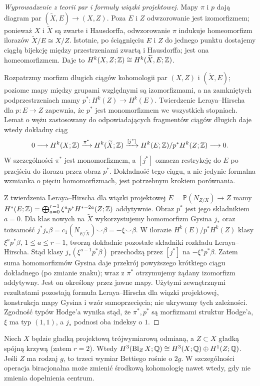 \begin{proof}[Wyprowadzenie z teorii par i formuły wiązki projektowej]
Mapy $\pi$ i $p$ dają diagram par $(\widetilde X,E)\to(X,Z)$.
Poza $E$ i $Z$ odwzorowanie jest izomorfizmem;
ponieważ $X$ i $\widetilde X$ są zwarte i Hausdorffa, odwzorowanie
$\pi$ indukuje homeomorfizm ilorazów
$\widetilde X/E\cong X/Z$. Istotnie, po ściągnięciu $E$ i $Z$
do jednego punktu dostajemy ciągłą bijekcję między przestrzeniami
zwartą i Hausdorffa; jest ona homeomorfizmem. Daje to
$H^k(X,Z;\mathbb{Z})\cong H^k(\widetilde X,E;\mathbb{Z})$.

Rozpatrzmy morfizm długich ciągów kohomologii par
$(X,Z)$ i $(\widetilde X,E)$; poziome mapy między grupami
względnymi są izomorfizmami, a na zamkniętych podprzestrzeniach
mamy $p^*:H^k(Z)\to H^k(E)$.
Twierdzenie Leraya--Hirscha dla $p:E\to Z$ zapewnia, że
$p^*$ jest monomorfizmem we wszystkich stopniach.
Lemat o wężu zastosowany do odpowiadających fragmentów
ciągów długich daje wtedy dokładny ciąg
\[
0\longrightarrow H^k(X;\mathbb{Z})\xrightarrow{\pi^*}
H^k(\widetilde X;\mathbb{Z})\xrightarrow{[j^*]}
H^k(E;\mathbb{Z})/p^*H^k(Z;\mathbb{Z})\longrightarrow0.
\]
W szczególności $\pi^*$ jest monomorfizmem, a $[j^*]$
oznacza restrykcję do $E$ po przejściu do ilorazu przez obraz
$p^*$. Dokładność tego ciągu, a nie jedynie formalna wzmianka
o pięciu homomorfizmach, jest potrzebnym krokiem porównania.

Z twierdzenia Leraya--Hirscha dla wiązki projektowej
$E=\mathbb P(N_{Z/X})\to Z$ mamy
$H^*(E;\mathbb{Z})=\bigoplus_{a=0}^{r-1}\xi^a p^*H^{*-2a}(Z;\mathbb{Z})$
addytywnie. Obraz $p^*$ jest jego składnikiem $a=0$.
Dla klas nowych na $\widetilde X$ wykorzystujemy
homomorfizm Gysina $j_*$ oraz tożsamość
$j^*j_*\beta=c_1(N_{E/\widetilde X})\smile\beta
=-\xi\smile\beta$.
W ilorazie $H^k(E)/p^*H^k(Z)$ klasy
$\xi^ap^*\beta$, $1\le a\le r-1$, tworzą dokładnie
pozostałe składniki rozkładu Leraya--Hirscha.
Stąd klasy $j_*(\xi^{a-1}p^*\beta)$ przechodzą przez
$[j^*]$ na $-\xi^ap^*\beta$. Zatem suma homomorfizmów
Gysina daje przekrój powyższego krótkiego ciągu dokładnego
(po zmianie znaku); wraz z $\pi^*$ otrzymujemy żądany
izomorfizm addytywny. Jest on określony przez jawne mapy.
Użytymi zewnętrznymi rezultatami pozostają formuła
Leraya--Hirscha dla wiązki projektowej, konstrukcja mapy
Gysina i wzór samoprzecięcia; nie ukrywamy tych zależności.
Zgodność typów Hodge'a wynika stąd, że $\pi^*,p^*$
są morfizmami struktur Hodge'a, $\xi$ ma typ $(1,1)$,
a $j_*$ podnosi oba indeksy o $1$.
\end{proof}
\begin{przyklad}
Niech $X$ będzie gładką projektową trójwymiarową odmianą,
a $Z\subset X$ gładką spójną krzywą (zatem $r=2$).
Wtedy $H^3(\operatorname{Bl}_Z X;\mathbb{Q})
\cong H^3(X;\mathbb{Q})\oplus H^1(Z;\mathbb{Q})$.
Jeśli $Z$ ma rodzaj $g$, to trzeci wymiar Bettiego rośnie o $2g$.
W szczególności operacja biracjonalna może zmienić środkową
kohomologię nawet wtedy, gdy nie zmienia dopełnienia centrum.
\end{przyklad}

